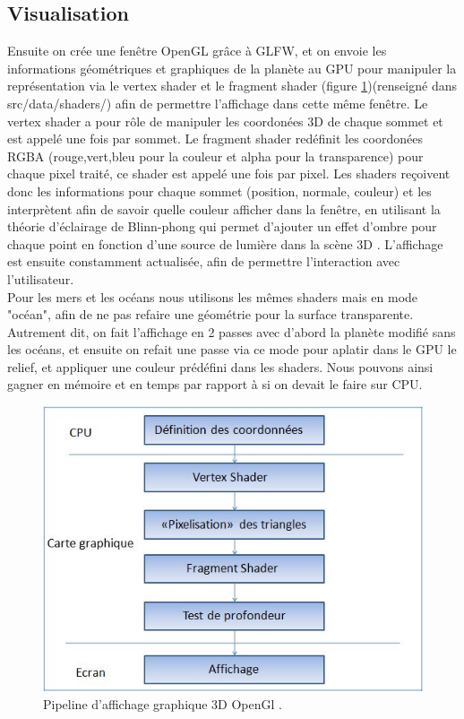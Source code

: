 \documentclass[a4paper]{article}
\begin{document}
\subsection{Visualisation}

Ensuite on crée une fenêtre OpenGL grâce à GLFW, et on envoie les informations géométriques et graphiques de la planète au GPU pour manipuler la représentation via le vertex shader et le fragment shader (figure \ref{shader_theory})(renseigné dans src/data/shaders/) afin de permettre l'affichage dans cette même fenêtre. Le vertex shader a pour rôle de manipuler les coordonées 3D de chaque sommet et est appelé une fois par sommet. Le fragment shader redéfinit les coordonées RGBA (rouge,vert,bleu pour la couleur et alpha pour la transparence) pour chaque pixel traité, ce shader est appelé une fois par pixel. Les shaders reçoivent donc les informations pour chaque sommet (position, normale, couleur) et les interprètent afin de savoir quelle couleur afficher dans la fenêtre, en utilisant la théorie d'éclairage de Blinn-phong qui permet d'ajouter un effet d'ombre pour chaque point en fonction d'une source de lumière dans la scène 3D \cite{BlinnPhong}. L'affichage est ensuite constamment actualisée, afin de permettre l'interaction avec l'utilisateur.\\
Pour les mers et les océans nous utilisons les mêmes shaders mais en mode "océan", afin de ne pas refaire une géométrie pour la surface transparente. Autrement dit, on fait l'affichage en 2 passes avec d'abord la planète modifié sans les océans, et ensuite on refait une passe via ce mode pour aplatir dans le GPU le relief, et appliquer une couleur prédéfini dans les shaders. Nous pouvons ainsi gagner en mémoire et en temps par rapport à si on devait le faire sur CPU.

\begin{figure}[!ht]
        \begin{center} \includegraphics[width=0.8\linewidth]{img/archi/shader_theory.jpg} \end{center}
        \caption{\label{shader_theory}Pipeline d'affichage graphique 3D OpenGl \protect\footnotemark .}
\end{figure}
\end{document}
